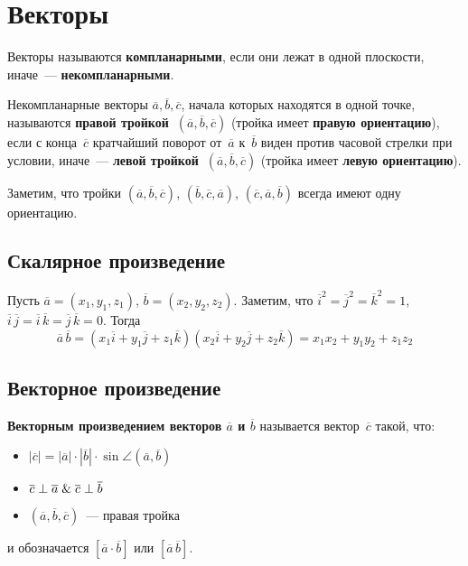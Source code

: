 \section{Векторы}
 Векторы называются \textbf{компланарными}, если они лежат в одной плоскости, иначе~--- \textbf{некомпланарными}.

Некомпланарные векторы $\overline a, \overline b, \overline c$, начала которых находятся в одной точке, называются \textbf{правой тройкой~$(\overline a, \overline b, \overline c)$} (тройка имеет \textbf{правую ориентацию}), если с конца~$\overline c$ кратчайший поворот от~$\overline a$ к~$\overline b$ виден против часовой стрелки при условии, иначе~--- \textbf{левой тройкой~$(\overline a, \overline b, \overline c)$} (тройка имеет \textbf{левую ориентацию}).

Заметим, что тройки $(\overline a, \overline b, \overline c)$, $(\overline b, \overline c, \overline a)$, $(\overline c, \overline a, \overline b)$ всегда имеют одну ориентацию.

\subsection{Скалярное произведение}
 Пусть $\overline a = (x_1, y_1, z_1)$, $\overline b = (x_2, y_2, z_2)$.
Заметим, что $\overline i^2 = \overline j^2 = \overline k^2 = 1$, $\overline i\,\overline j = \overline i\,\overline k = \overline j\,\overline k = 0$.
Тогда
\begin{equation*}
\overline a\,\overline b =
(x_1 \overline i + y_1 \overline j + z_1 \overline k)(x_2 \overline i + y_2 \overline j + z_2 \overline k) =
x_1 x_2 + y_1 y_2 + z_1 z_2
\end{equation*}

\subsection{Векторное произведение}
 \textbf{Векторным произведением векторов $\overline a$ и $\overline b$} называется вектор~$\overline c$ такой, что:
\begin{itemize}
	\item $|\overline c| = |\overline a| \cdot |\overline b| \cdot \sin \angle(\overline a, \overline b)$
	\item $\overline c \perp \overline a \mathrel{\&} \overline c \perp \overline b$
	\item $(\overline a, \overline b, \overline c)$~--- правая тройка
\end{itemize}
и обозначается $[\overline a \cdot \overline b]$ или $[\overline a\,\overline b]$.

